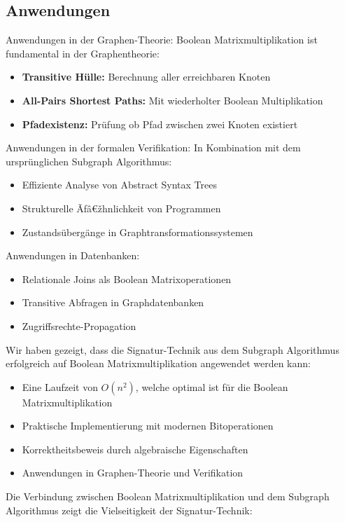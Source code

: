 ﻿\documentclass[a4paper,12pt]{article}
\theoremstyle{definition}
\begin{document}
\subsection{Anwendungen}
Anwendungen in der Graphen-Theorie: Boolean Matrixmultiplikation ist fundamental in der Graphentheorie:
\begin{itemize}
	\item[-] \textbf{Transitive Hülle:} Berechnung aller erreichbaren Knoten
	\item[-] \textbf{All-Pairs Shortest Paths:} Mit wiederholter Boolean Multiplikation
	\item[-] \textbf{Pfadexistenz:} Prüfung ob Pfad zwischen zwei Knoten existiert
\end{itemize}
Anwendungen in der formalen Verifikation: In Kombination mit dem ursprünglichen Subgraph Algorithmus:
\begin{itemize}
	\item[-] Effiziente Analyse von Abstract Syntax Trees
	\item[-] Strukturelle Ãƒâ€žhnlichkeit von Programmen
	\item[-] Zustandsübergänge in Graphtransformationssystemen
\end{itemize}
Anwendungen in Datenbanken:
\begin{itemize}
	\item[-] Relationale Joins als Boolean Matrixoperationen
	\item[-] Transitive Abfragen in Graphdatenbanken
	\item[-] Zugriffsrechte-Propagation
\end{itemize}

Wir haben gezeigt, dass die Signatur-Technik aus dem Subgraph Algorithmus erfolgreich auf Boolean Matrixmultiplikation angewendet werden kann:
\begin{itemize}
	\item[-] Eine Laufzeit von $O(n^2)$, welche optimal ist für die Boolean Matrixmultiplikation
	\item[-] Praktische Implementierung mit modernen Bitoperationen
	\item[-] Korrektheitsbeweis durch algebraische Eigenschaften
	\item[-] Anwendungen in Graphen-Theorie und Verifikation
\end{itemize}

Die Verbindung zwischen Boolean Matrixmultiplikation und dem Subgraph Algorithmus zeigt die Vielseitigkeit der Signatur-Technik:
\end{document}
